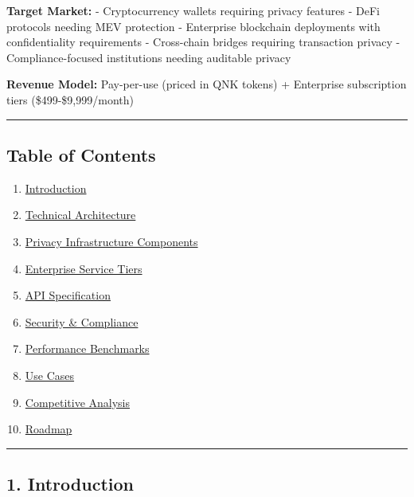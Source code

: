 \documentclass[
  11pt,
]{article}
\providecommand{\tightlist}{%
  \setlength{\itemsep}{0pt}\setlength{\parskip}{0pt}}
\begin{document}
\textbf{Target Market:} - Cryptocurrency wallets requiring privacy
features - DeFi protocols needing MEV protection - Enterprise blockchain
deployments with confidentiality requirements - Cross-chain bridges
requiring transaction privacy - Compliance-focused institutions needing
auditable privacy

\textbf{Revenue Model:} Pay-per-use (priced in QNK tokens) + Enterprise
subscription tiers (\$499-\$9,999/month)

\begin{center}\rule{0.5\linewidth}{0.5pt}\end{center}

\hypertarget{table-of-contents}{%
\subsection{Table of Contents}\label{table-of-contents}}

\begin{enumerate}
\def\labelenumi{\arabic{enumi}.}
\tightlist
\item
  \protect\hyperlink{1-introduction}{Introduction}
\item
  \protect\hyperlink{2-technical-architecture}{Technical Architecture}
\item
  \protect\hyperlink{3-privacy-infrastructure-components}{Privacy
  Infrastructure Components}
\item
  \protect\hyperlink{4-enterprise-service-tiers}{Enterprise Service
  Tiers}
\item
  \protect\hyperlink{5-api-specification}{API Specification}
\item
  \protect\hyperlink{6-security--compliance}{Security \& Compliance}
\item
  \protect\hyperlink{7-performance-benchmarks}{Performance Benchmarks}
\item
  \protect\hyperlink{8-use-cases}{Use Cases}
\item
  \protect\hyperlink{9-competitive-analysis}{Competitive Analysis}
\item
  \protect\hyperlink{10-roadmap}{Roadmap}
\end{enumerate}

\begin{center}\rule{0.5\linewidth}{0.5pt}\end{center}

\hypertarget{introduction}{%
\subsection{1. Introduction}\label{introduction}}
\end{document}
